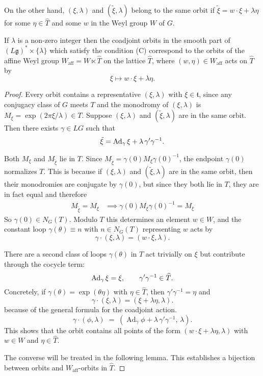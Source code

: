 \documentclass[12pt]{article}
\begin{document}
On the other hand, $(\xi,\lambda)$ and $(\tilde{\xi},\lambda)$ belong to the same orbit if  $\tilde{\xi} = w \cdot \xi + \lambda \eta$ for some $\eta \in \hat{T}$ and some $w$ in the Weyl group $W$ of $G$.

\begin{proposition}
    If $\lambda$ is a non-zero integer then the coadjoint orbits in the smooth part of
    $(L\mathfrak{g})^* \times \{\lambda\}$ which satisfy the condition (C) correspond
    to the orbits of the affine Weyl group
    $W_{\mathrm{aff}} = W \ltimes \hat{T}$ on the lattice $\hat{T}$, where
    $(w,\eta) \in W_{\mathrm{aff}}$ acts on $\hat{T}$ by
    \[
        \xi \mapsto w \cdot \xi + \lambda \eta.
    \]
\end{proposition}

\begin{proof}
    Every orbit contains a representative $(\xi,\lambda)$ with $\xi\in\mathfrak t$,
    since any conjugacy class of $G$ meets $T$ and the monodromy of $(\xi,\lambda)$
    is $M_\xi = \exp(2\pi \xi/\lambda)\in T$.
    Suppose $(\xi,\lambda)$ and $(\tilde\xi,\lambda)$ are in the same orbit.
    Then there exists $\gamma\in LG$ such that
    \[
        \tilde\xi = \operatorname{Ad}_\gamma\xi + \lambda\,\gamma'\gamma^{-1}.
    \]

    Both $M_\xi$ and $M_{\tilde\xi}$ lie in $T$. Since
    $M_{\tilde\xi}=\gamma(0)M_\xi\gamma(0)^{-1}$, the endpoint $\gamma(0)$ normalizes $T$.
    This is because if $(\xi,\lambda)$ and $(\tilde\xi,\lambda)$ are in the same orbit, then their monodromies are conjugate by $\gamma(0)$, but since they both lie in $T$, they are in fact equal and therefore \begin{align*}
        M_{\tilde\xi} = M_\xi & \implies \gamma(0)M_\xi\gamma(0)^{-1} = M_\xi
    \end{align*}
    So $\gamma(0)\in N_G(T)$. Modulo $T$ this determines an element $w\in W$, and the
    constant loop $\gamma(\theta)\equiv n$ with $n\in N_G(T)$ representing $w$ acts by
    \[
        \gamma\cdot(\xi,\lambda) = (w\cdot\xi,\lambda).
    \]

    There are a second class of loops $\gamma(\theta)$ in $T$ act trivially on $\xi$ but contribute through the cocycle term:
    \[
        \operatorname{Ad}_\gamma \xi = \xi, \qquad \gamma'\gamma^{-1}\in \widehat T.
    \]
    Concretely, if $\gamma(\theta)=\exp(\theta\eta)$ with $\eta\in\widehat T$,
    then $\gamma'\gamma^{-1}=\eta$ and
    \[
        \gamma\cdot(\xi,\lambda) = (\xi+\lambda\eta,\lambda).
    \]
    because of the general formula for the coadjoint action. \[
        \gamma\cdot(\phi,\lambda) \;=\; (\operatorname{Ad}_\gamma\phi + \lambda\,\gamma'\gamma^{-1},\,\lambda).
    \]
    This shows that the orbit contains all points of the form
    $(w\cdot\xi+\lambda\eta,\lambda)$ with $w\in W$ and $\eta\in\widehat T$.

    The converse will be treated in the following lemma. This establishes a bijection between orbits and $W_{\mathrm{aff}}$-orbits
    in $\hat{T}$.
\end{proof}
\end{document}
